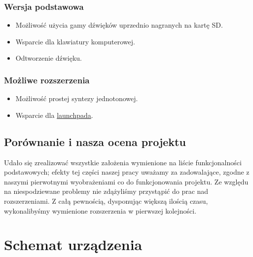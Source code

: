 \documentclass{article}
\begin{document}
\subsubsection{Wersja podstawowa}

\begin{itemize}
    \item Możliwość użycia gamy dźwięków uprzednio nagranych na kartę SD. 
    \item Wsparcie dla klawiatury komputerowej.
    \item Odtworzenie dźwięku.
\end{itemize} 

\subsubsection{Możliwe rozszerzenia}

\begin{itemize}
    \item Możliwość prostej syntezy jednotonowej.
    \item Wsparcie dla \href{https://pl.wikipedia.org/wiki/Launchpad}{launchpada}.
\end{itemize}

\subsection{Porównanie i nasza ocena projektu}
Udało się zrealizować wszystkie założenia wymienione na liście funkcjonalności podstawowych; efekty tej części naszej pracy uważamy za zadowalające, zgodne z naszymi pierwotnymi wyobrażeniami co do funkcjonowania projektu. Ze względu na niespodziewane problemy nie zdążyliśmy przystąpić do prac nad rozszerzeniami. Z całą pewnością, dysponując większą ilością czasu, wykonalibyśmy wymienione rozszerzenia w pierwszej kolejności.

\section{Schemat urządzenia}

\begin{figure}[H]
    \centering
\end{figure}
\end{document}
